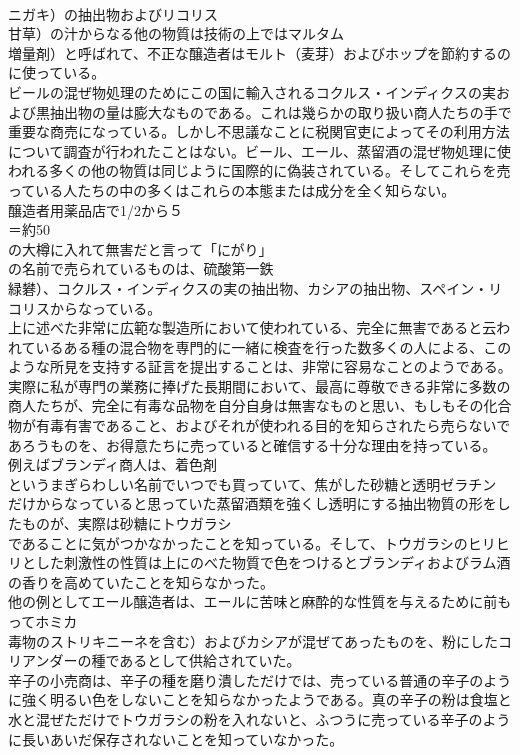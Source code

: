 \documentclass[8pt]{extreport}
\begin{document}
\begin{CJK}{UTF8}{min}
\\	ニガキ）の抽出物およびリコリス
\\	甘草）の汁からなる他の物質は技術の上ではマルタム
\\	増量剤）と呼ばれて、不正な醸造者はモルト（麦芽）およびホップを節約するのに使っている。
\\	ビールの混ぜ物処理のためにこの国に輸入されるコクルス・インディクスの実および黒抽出物の量は膨大なものである。これは幾らかの取り扱い商人たちの手で重要な商売になっている。しかし不思議なことに税関官吏によってその利用方法について調査が行われたことはない。ビール、エール、蒸留酒の混ぜ物処理に使われる多くの他の物質は同じように国際的に偽装されている。そしてこれらを売っている人たちの中の多くはこれらの本態または成分を全く知らない。
\\	醸造者用薬品店で1/2から５
\\	＝約50
\\	の大樽に入れて無害だと言って「にがり」
\\	の名前で売られているものは、硫酸第一鉄
\\	緑礬）、コクルス・インディクスの実の抽出物、カシアの抽出物、スペイン・リコリスからなっている。
\\	上に述べた非常に広範な製造所において使われている、完全に無害であると云われているある種の混合物を専門的に一緒に検査を行った数多くの人による、このような所見を支持する証言を提出することは、非常に容易なことのようである。実際に私が専門の業務に捧げた長期間において、最高に尊敬できる非常に多数の商人たちが、完全に有毒な品物を自分自身は無害なものと思い、もしもその化合物が有毒有害であること、およびそれが使われる目的を知らされたら売らないであろうものを、お得意たちに売っていると確信する十分な理由を持っている。
\\	例えばブランディ商人は、着色剤
\\	というまぎらわしい名前でいつでも買っていて、焦がした砂糖と透明ゼラチン
\\	だけからなっていると思っていた蒸留酒類を強くし透明にする抽出物質の形をしたものが、実際は砂糖にトウガラシ
\\	であることに気がつかなかったことを知っている。そして、トウガラシのヒリヒリとした刺激性の性質は上にのべた物質で色をつけるとブランディおよびラム酒の香りを高めていたことを知らなかった。
\\	他の例としてエール醸造者は、エールに苦味と麻酔的な性質を与えるために前もってホミカ
\\	毒物のストリキニーネを含む）およびカシアが混ぜてあったものを、粉にしたコリアンダーの種であるとして供給されていた。
\\	辛子の小売商は、辛子の種を磨り潰しただけでは、売っている普通の辛子のように強く明るい色をしないことを知らなかったようである。真の辛子の粉は食塩と水と混ぜただけでトウガラシの粉を入れないと、ふつうに売っている辛子のように長いあいだ保存されないことを知っていなかった。

\end{CJK}
\end{document}
